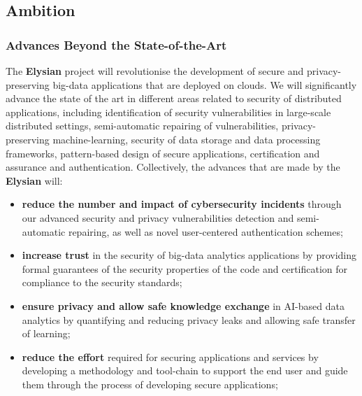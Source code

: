 \documentclass[a4paper,11pt]{article}
\newcommand{\project}[1]{\textbf{#1}\xspace}
\newcommand{\SECURITY}{\project{Elysian}}
\newcommand{\TheProject}{\SECURITY}
\begin{document}
\subsection{Ambition}


\subsubsection{Advances Beyond the State-of-the-Art}
\label{sec:novelty}




The \TheProject{} project will revolutionise the development of secure and privacy-preserving big-data applications that are deployed on clouds. We will significantly advance the state of the art in different areas related to security of distributed applications, including identification of security vulnerabilities in large-scale distributed settings, semi-automatic repairing of vulnerabilities, privacy-preserving machine-learning, security of data storage and data processing frameworks, pattern-based design of secure applications, certification and assurance and authentication. Collectively, the advances that are made by the \TheProject{} will:
\begin{itemize}
\item \textbf{reduce the number and impact of cybersecurity incidents} through our advanced security and privacy vulnerabilities detection and semi-automatic repairing, as well as novel user-centered authentication schemes;
\item \textbf{increase trust} in the security of big-data analytics applications by providing formal guarantees of the security properties of the code and certification for compliance to the security standards;
\item \textbf{ensure privacy and allow safe knowledge exchange} in AI-based data analytics by quantifying and reducing privacy leaks and allowing safe transfer of learning;
\item \textbf{reduce the effort} required for securing applications and services by developing a methodology and tool-chain to support the end user and guide them through the process of developing secure applications;

\end{itemize}
\end{document}
